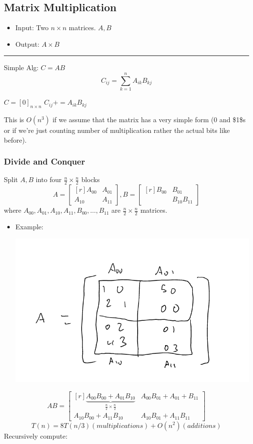\documentclass[11pt]{article}
\begin{document}
\subsection{Matrix Multiplication}
\label{sec:orgd7439b6}
\begin{itemize}
\item Input: Two \(n\times n\) matrices. \(A,B\)
\item Output: \(A \times B\)
\end{itemize}

\noindent\rule{\textwidth}{0.5pt}
Simple Alg: \(C=AB\)
$$C_{ij}=\sum_{k=1}^{n}A_{ik}B_{kj}$$
\begin{algorithmic}
\State $C=[0]_{n\times n}$
			\State $C_{ij}+=A_{ik}B_{kj}$
		\EndFor
	\EndFor
\EndFor
\end{algorithmic}
This is \(O(n^3)\) if we assume that the matrix has a very simple form (\(0\) and \$1\$s or if we're just counting number of multiplication rather the actual bits like before).
\subsubsection{Divide and Conquer}
\label{sec:orgff6fee7}
Split \(A,B\) into four \(\frac{n}{2}\times \frac{n}{2}\) blocks
$$ A = \begin{bmatrix*}[r] A_{00} & A_{01} \\ A_{10} & A_{11} \end{bmatrix*}, B = \begin{bmatrix*}[r] B_{00} & B_{01} \\ & B_{10} B_11 \end{bmatrix*}$$
where \(A_{00},A_{01}, A_{10}, A_{11}, B_{00}, \ldots, B_{11}\) are \(\frac{n}{2} \times \frac{n}{2}\) matrices.
\begin{itemize}
\item Example: \begin{center}
\includegraphics[width=.9\linewidth]{./Images/i80.png}
\end{center}
\end{itemize}
$$AB = \begin{bmatrix*}[r] \underbrace{A_{00}B_{00}+A_{01}B_{10}}_{\frac{n}{2}\times \frac{n}{2}} & A_{00}B_{01}+A_{01}+B_{11}
\\ A_{10}B_{00}+A_{11}B_{10} & A_{10}B_{01}+A_{11}B_{11}
\end{bmatrix*}$$
$$T(n)=8T(n/3) (multiplications)+O(n^2) (additions)$$
Recursively compute:
\end{document}
